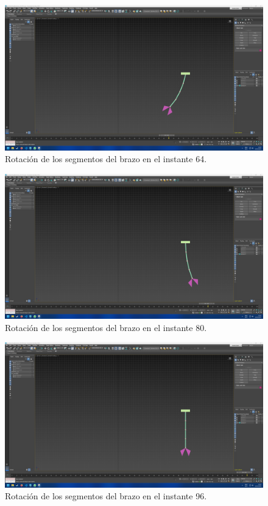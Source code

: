 \documentclass{article}
\begin{document}
\begin{figure}[H]
    \centering
    \includegraphics[width=\textwidth]{imagenes/Ejercicio4/keyframes/64.png}
    \caption{Rotación de los segmentos del brazo en el instante 64.}
\end{figure}


\begin{figure}[H]
    \centering
    \includegraphics[width=\textwidth]{imagenes/Ejercicio4/keyframes/80.png}
    \caption{Rotación de los segmentos del brazo en el instante 80.}
\end{figure}

\begin{figure}[H]
    \centering
    \includegraphics[width=\textwidth]{imagenes/Ejercicio4/keyframes/96.png}
    \caption{Rotación de los segmentos del brazo en el instante 96.}
\end{figure}
\end{document}
